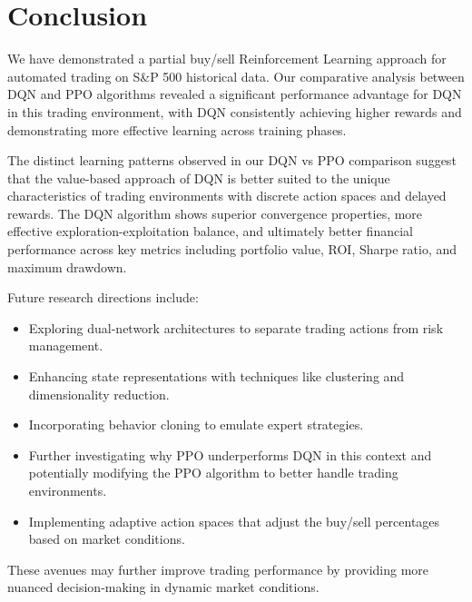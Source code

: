 \documentclass[11pt]{article}
\begin{document}
\section{Conclusion}
We have demonstrated a partial buy/sell Reinforcement Learning approach for automated trading on S\&P 500 historical data. Our comparative analysis between DQN and PPO algorithms revealed a significant performance advantage for DQN in this trading environment, with DQN consistently achieving higher rewards and demonstrating more effective learning across training phases.

The distinct learning patterns observed in our DQN vs PPO comparison suggest that the value-based approach of DQN is better suited to the unique characteristics of trading environments with discrete action spaces and delayed rewards. The DQN algorithm shows superior convergence properties, more effective exploration-exploitation balance, and ultimately better financial performance across key metrics including portfolio value, ROI, Sharpe ratio, and maximum drawdown.

Future research directions include:
\begin{itemize}
  \item Exploring dual-network architectures to separate trading actions from risk management.
  \item Enhancing state representations with techniques like clustering and dimensionality reduction.
  \item Incorporating behavior cloning to emulate expert strategies.
  \item Further investigating why PPO underperforms DQN in this context and potentially modifying the PPO algorithm to better handle trading environments.
  \item Implementing adaptive action spaces that adjust the buy/sell percentages based on market conditions.
\end{itemize}

These avenues may further improve trading performance by providing more nuanced decision-making in dynamic market conditions.



\end{document}
